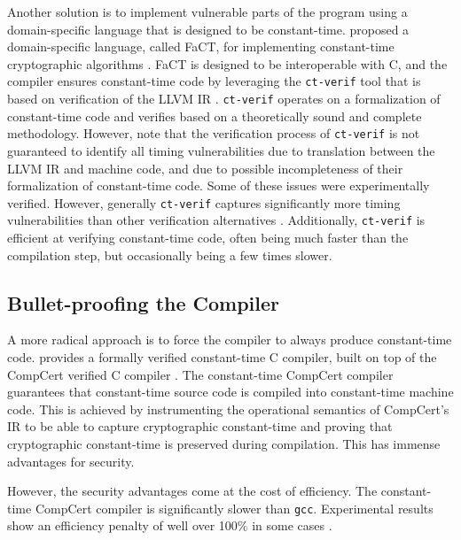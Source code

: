 Another solution is to implement vulnerable parts of the program using a domain-specific language that is designed to be constant-time.
\citeauthor{fact} proposed a domain-specific language, called FaCT, for implementing constant-time cryptographic algorithms \citep{fact}.
FaCT is designed to be interoperable with C, and the compiler ensures constant-time code by leveraging the \texttt{ct-verif} tool that is based on verification of the LLVM IR \cite{verifying-constant-time-llvm}.
\texttt{ct-verif} operates on a formalization of constant-time code and verifies based on a theoretically sound and complete methodology.
However, \citeauthor{verifying-constant-time-llvm} note that the verification process of \texttt{ct-verif} is not guaranteed to identify all timing vulnerabilities due to translation between the LLVM IR and machine code, and due to possible incompleteness of their formalization of constant-time code. 
Some of these issues were experimentally verified.
However, generally \texttt{ct-verif} captures significantly more timing vulnerabilities than other verification alternatives \citep{verifying-constant-time-llvm}.
Additionally, \texttt{ct-verif} is efficient at verifying constant-time code, often being much faster than the compilation step, but occasionally being a few times slower.

\subsection{Bullet-proofing the Compiler}
A more radical approach is to force the compiler to always produce constant-time code.
\citeauthor{verified-constant-time-c-comiler} provides a formally verified constant-time C compiler, built on top of the CompCert verified C compiler \citep{verified-constant-time-c-comiler}. 
The constant-time CompCert compiler guarantees that constant-time source code is compiled into constant-time machine code.
This is achieved by instrumenting the operational semantics of CompCert's IR to be able to capture cryptographic constant-time and proving that cryptographic constant-time is preserved during compilation. 
This has immense advantages for security.

However, the security advantages come at the cost of efficiency. 
The constant-time CompCert compiler is significantly slower than \texttt{gcc}.
Experimental results show an efficiency penalty of well over 100\% in some cases \citep{verified-constant-time-c-comiler}.

